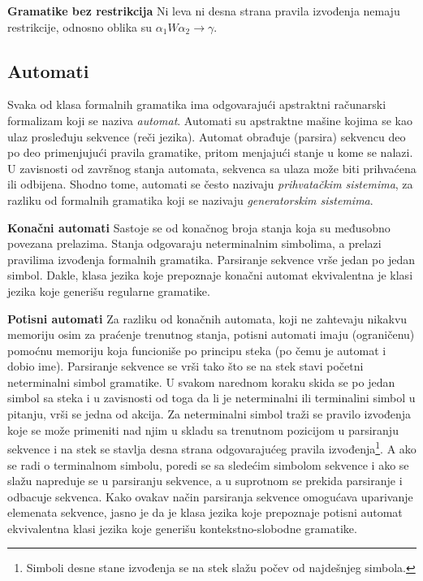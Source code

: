 \documentclass[a4paper, 12pt]{article}
\begin{document}
\vspace*{0.2cm}
\noindent \textbf{Gramatike bez restrikcija} \hspace{0.3cm} Ni leva ni desna strana pravila izvođenja nemaju restrikcije, odnosno oblika su $\alpha_1 W  \alpha_2 \rightarrow \gamma$. 

\subsection{Automati}

Svaka od klasa formalnih gramatika ima odgovarajući apstraktni računarski formalizam koji se naziva \textit{automat}. Automati su apstraktne mašine kojima se kao ulaz prosleđuju sekvence (reči jezika). Automat obrađuje (parsira) sekvencu deo po deo primenjujući pravila gramatike, pritom menjajući stanje u kome se nalazi. U zavisnosti od završnog stanja automata, sekvenca sa ulaza može biti prihvaćena ili odbijena. Shodno tome, automati se često nazivaju \textit{prihvatačkim sistemima}, za razliku od formalnih gramatika koji se nazivaju \textit{generatorskim sistemima}. 

\noindent \textbf{Konačni automati} \hspace{0.3cm} Sastoje se od konačnog broja stanja koja su međusobno povezana prelazima. Stanja odgovaraju neterminalnim simbolima, a prelazi pravilima izvođenja formalnih gramatika. Parsiranje sekvence vrše jedan po jedan simbol. Dakle, klasa jezika koje prepoznaje konačni automat ekvivalentna je klasi jezika koje generišu regularne gramatike.

\vspace*{0.2cm}
\noindent \textbf{Potisni automati} \hspace{0.3cm} Za razliku od konačnih automata, koji ne zahtevaju nikakvu memoriju osim za praćenje trenutnog stanja, potisni automati imaju (ograničenu) pomoćnu memoriju koja funcioniše po principu steka (po čemu je automat i dobio ime). Parsiranje sekvence se vrši tako što se na stek stavi početni neterminalni simbol gramatike. U svakom narednom koraku skida se po jedan simbol sa steka i u zavisnosti od toga da li je neterminalni ili terminalini simbol u pitanju, vrši se jedna od akcija. Za neterminalni simbol traži se pravilo izvođenja koje se može primeniti nad njim u skladu sa trenutnom pozicijom u parsiranju sekvence i na stek se stavlja desna strana odgovarajućeg pravila izvođenja\footnote{Simboli desne stane izvođenja se na stek slažu počev od najdešnjeg simbola.}. A ako se radi o terminalnom simbolu, poredi se sa sledećim simbolom sekvence i ako se slažu napreduje se u parsiranju sekvence, a u suprotnom se prekida parsiranje i odbacuje sekvenca.
Kako ovakav način parsiranja sekvence omogućava uparivanje elemenata sekvence, jasno je da je klasa jezika koje prepoznaje potisni automat ekvivalentna klasi jezika koje generišu kontekstno-slobodne gramatike.
\end{document}
